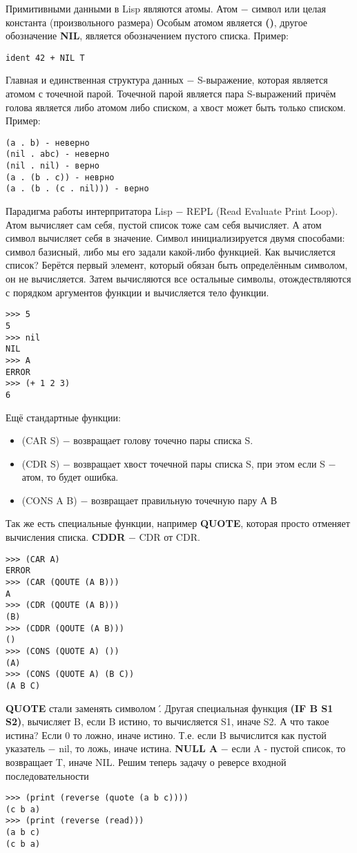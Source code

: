 \documentclass[a4paper, 12pt, titlepage, finall]{extreport}
\begin{document}
            Примитивными данными в Lisp являются атомы.
            Атом $-$ символ или целая константа (произвольного размера)
            Особым атомом является \textbf{()}, другое обозначение \textbf{NIL}, является обозначением пустого списка.
            Пример:
\begin{lstlisting}
ident 42 + NIL T
\end{lstlisting}
            Главная и единственная структура данных $-$ S-выражение, которая является атомом с точечной парой.
            Точечной парой является пара S-выражений причём голова является либо атомом либо списком, а хвост может быть только списком.
            Пример: 
\begin{lstlisting}            
(a . b) - неверно
(nil . abc) - неверно
(nil . nil) - верно
(a . (b . c)) - неврно
(a . (b . (c . nil))) - верно
\end{lstlisting}
            Парадигма работы интерпритатора Lisp $-$ REPL (Read Evaluate Print Loop).
            Атом вычисляет сам себя, пустой список тоже сам себя вычисляет. А атом символ вычисляет себя в значение.
            Символ инициализируется двумя способами: символ базисный, либо мы его задали какой-либо функцией.
            Как вычисляется список? Берётся первый элемент, который обязан быть определённым символом, он не вычисляется.
            Затем вычисляются все остальные символы, отождествляются с порядком аргументов функции и вычисляется тело функции.
\begin{lstlisting}
>>> 5
5
>>> nil
NIL
>>> A
ERROR
>>> (+ 1 2 3)
6
\end{lstlisting}
            Ещё стандартные функции:
            \begin{itemize}
                \item (CAR S) $-$ возвращает голову точечно пары списка S.
                \item (CDR S) $-$ возвращает хвост точечной пары списка S, при этом если S $-$ атом, то будет ошибка.
                \item (CONS A B) $-$ возвращает правильную точечную пару А В
            \end{itemize}
            Так же есть специальные функции, например \textbf{QUOTE}, которая просто отменяет вычисления списка.
            \textbf{CDDR} $-$ CDR от CDR.
\begin{lstlisting}
>>> (CAR A)
ERROR
>>> (CAR (QOUTE (A B)))
A
>>> (CDR (QOUTE (A B)))
(B)
>>> (CDDR (QOUTE (A B)))
()
>>> (CONS (QUOTE A) ())
(A)
>>> (CONS (QUOTE A) (B C))
(A B C)
\end{lstlisting}
            \textbf{QUOTE} стали заменять символом \'.
            Другая специальная функция \textbf{(IF B S1 S2)}, вычисляет B, если B истино, то вычисляется S1, иначе S2.
            А что такое истина? Если 0 то ложно, иначе истино. Т.е. если B вычислится как пустой указатель $-$ nil, то ложь,
            иначе истина. \textbf{NULL A} $-$ если A - пустой список, то возвращает T, иначе NIL.
            Решим теперь задачу о реверсе входной последовательности
\begin{lstlisting}
>>> (print (reverse (quote (a b c))))
(c b a)
>>> (print (reverse (read)))
(a b c)
(c b a)
\end{lstlisting}
\end{document}
